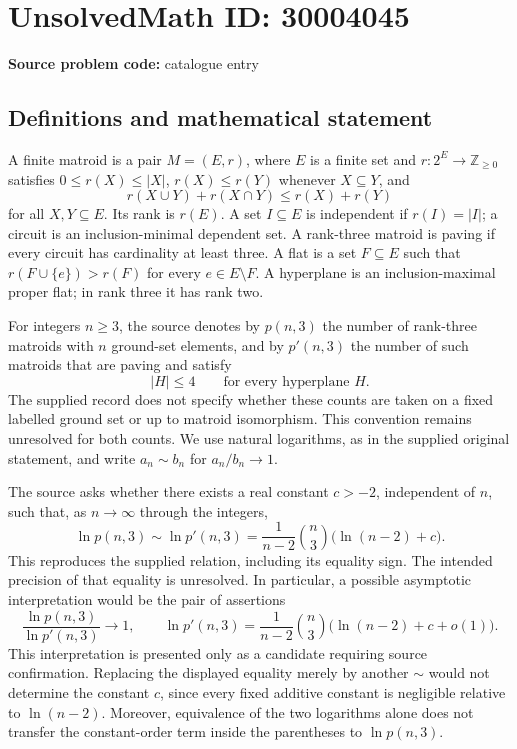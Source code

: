 \documentclass[11pt]{article}
\newcommand{\Z}{\mathbb{Z}}
\begin{document}
\section*{UnsolvedMath ID: 30004045}
\textbf{Source problem code:} catalogue entry
\subsection{Definitions and mathematical statement}
A finite matroid is a pair \(M=(E,r)\), where \(E\) is a finite set and \(r:2^E\to\Z_{\geq 0}\) satisfies \(0\leq r(X)\leq |X|\), \(r(X)\leq r(Y)\) whenever \(X\subseteq Y\), and
\[
r(X\cup Y)+r(X\cap Y)\leq r(X)+r(Y)
\]
for all \(X,Y\subseteq E\). Its rank is \(r(E)\). A set \(I\subseteq E\) is independent if \(r(I)=|I|\); a circuit is an inclusion-minimal dependent set. A rank-three matroid is paving if every circuit has cardinality at least three. A flat is a set \(F\subseteq E\) such that \(r(F\cup\{e\})>r(F)\) for every \(e\in E\setminus F\). A hyperplane is an inclusion-maximal proper flat; in rank three it has rank two.

For integers \(n\geq 3\), the source denotes by \(p(n,3)\) the number of rank-three matroids with \(n\) ground-set elements, and by \(p'(n,3)\) the number of such matroids that are paving and satisfy
\[
|H|\leq 4\qquad\text{for every hyperplane }H.
\]
The supplied record does not specify whether these counts are taken on a fixed labelled ground set or up to matroid isomorphism. This convention remains unresolved for both counts. We use natural logarithms, as in the supplied original statement, and write \(a_n\sim b_n\) for \(a_n/b_n\to 1\).

The source asks whether there exists a real constant \(c>-2\), independent of \(n\), such that, as \(n\to\infty\) through the integers,
\[
\ln p(n,3)\sim\ln p'(n,3)
=\frac{1}{n-2}\binom{n}{3}\bigl(\ln(n-2)+c\bigr).
\]
This reproduces the supplied relation, including its equality sign. The intended precision of that equality is unresolved. In particular, a possible asymptotic interpretation would be the pair of assertions
\[
\frac{\ln p(n,3)}{\ln p'(n,3)}\longrightarrow 1,
\qquad
\ln p'(n,3)=\frac{1}{n-2}\binom{n}{3}
\bigl(\ln(n-2)+c+o(1)\bigr).
\]
This interpretation is presented only as a candidate requiring source confirmation. Replacing the displayed equality merely by another \(\sim\) would not determine the constant \(c\), since every fixed additive constant is negligible relative to \(\ln(n-2)\). Moreover, equivalence of the two logarithms alone does not transfer the constant-order term inside the parentheses to \(\ln p(n,3)\).
\end{document}
